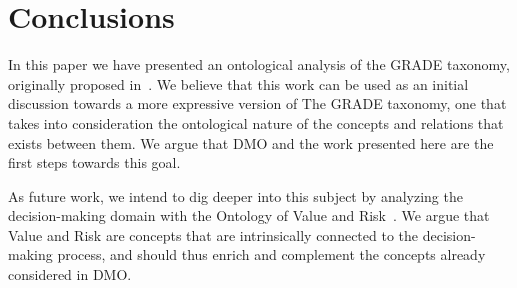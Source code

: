 \section{Conclusions}
\label{sec-conclusions}

In this paper we have presented an ontological analysis of the GRADE taxonomy, originally proposed in~\cite{papatheocharous2015decision}. We believe that this work can be used as an initial discussion towards a more expressive version of The GRADE taxonomy, one that takes into consideration the ontological nature of the concepts and relations that exists between them. We argue that DMO and the work presented here are the first steps towards this goal.

As future work, we intend to dig deeper into this subject by analyzing the decision-making domain with the Ontology of Value and Risk~\cite{value-risk-2018}. We argue that Value and Risk are concepts that are intrinsically connected to the decision-making process, and should thus enrich and complement the concepts already considered in DMO.

